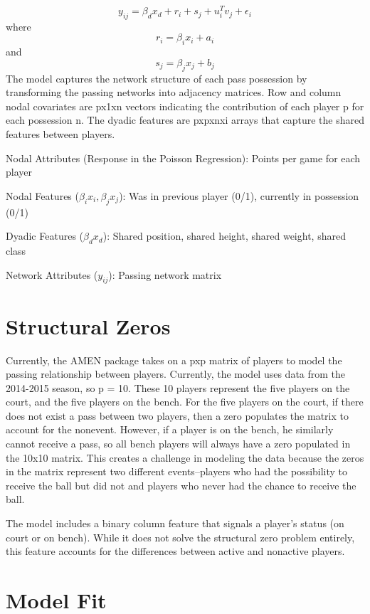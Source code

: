 \documentclass[12pt,twoside]{dukestatscithesis}
\theoremstyle{definition}
\theoremstyle{definition}
\theoremstyle{definition}
\theoremstyle{remark}
\begin{document}
\[y_{ij} =  \beta_{d}x_{d} + r_{i} + s_{j} + u_{i}^{T}v_{j} + \epsilon_{i}\]
where \[r_{i} = \beta_{i}x_{i} + a_{i}\] and
\[s_{j} = \beta_{j}x_{j} + b_{j}\] The model captures the network
structure of each pass possession by transforming the passing networks
into adjacency matrices. Row and column nodal covariates are px1xn
vectors indicating the contribution of each player p for each possession
n. The dyadic features are pxpxnxi arrays that capture the shared
features between players.

Nodal Attributes (Response in the Poisson Regression): Points per game
for each player

Nodal Features (\(\beta_{i}x_{i}, \beta_{j}x_{j}\)): Was in previous
player (0/1), currently in possession (0/1)

Dyadic Features (\(\beta_{d}x_{d}\)): Shared position, shared height,
shared weight, shared class

Network Attributes (\(y_{ij}\)): Passing network matrix

\section{Structural Zeros}\label{structural-zeros}

Currently, the AMEN package takes on a pxp matrix of players to model
the passing relationship between players. Currently, the model uses data
from the 2014-2015 season, so p = 10. These 10 players represent the
five players on the court, and the five players on the bench. For the
five players on the court, if there does not exist a pass between two
players, then a zero populates the matrix to account for the nonevent.
However, if a player is on the bench, he similarly cannot receive a
pass, so all bench players will always have a zero populated in the
10x10 matrix. This creates a challenge in modeling the data because the
zeros in the matrix represent two different events--players who had the
possibility to receive the ball but did not and players who never had
the chance to receive the ball.

The model includes a binary column feature that signals a player's
status (on court or on bench). While it does not solve the structural
zero problem entirely, this feature accounts for the differences between
active and nonactive players.

\section{Model Fit}\label{model-fit}
\end{document}
